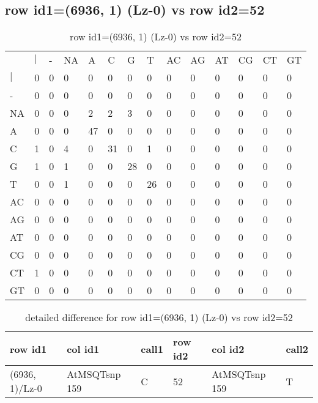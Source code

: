 \subsection{row id1=(6936, 1) (Lz-0) vs row id2=52}
\begin{center}
\begin{longtable}{|l|l|l|l|l|l|l|l|l|l|l|l|l|l|}
\caption{row id1=(6936, 1) (Lz-0) vs row id2=52} \label{table_dm140}\\
\hline
\\
\hline
&$|$&-&NA&A&C&G&T&AC&AG&AT&CG&CT&GT\\
$|$&0&0&0&0&0&0&0&0&0&0&0&0&0\\
-&0&0&0&0&0&0&0&0&0&0&0&0&0\\
NA&0&0&0&2&2&3&0&0&0&0&0&0&0\\
A&0&0&0&47&0&0&0&0&0&0&0&0&0\\
C&1&0&4&0&31&0&1&0&0&0&0&0&0\\
G&1&0&1&0&0&28&0&0&0&0&0&0&0\\
T&0&0&1&0&0&0&26&0&0&0&0&0&0\\
AC&0&0&0&0&0&0&0&0&0&0&0&0&0\\
AG&0&0&0&0&0&0&0&0&0&0&0&0&0\\
AT&0&0&0&0&0&0&0&0&0&0&0&0&0\\
CG&0&0&0&0&0&0&0&0&0&0&0&0&0\\
CT&1&0&0&0&0&0&0&0&0&0&0&0&0\\
GT&0&0&0&0&0&0&0&0&0&0&0&0&0\\
\hline
\end{longtable}
\end{center}

\begin{center}
\begin{longtable}{|l|l|l|l|l|l|}
\caption{detailed difference for row id1=(6936, 1) (Lz-0) vs row id2=52} \label{table_dm141}\\
\hline
row id1&col id1&call1&row id2&col id2&call2\\
\hline
(6936, 1)/Lz-0&AtMSQTsnp 159&C&52&AtMSQTsnp 159&T\\
\hline
\end{longtable}
\end{center}

